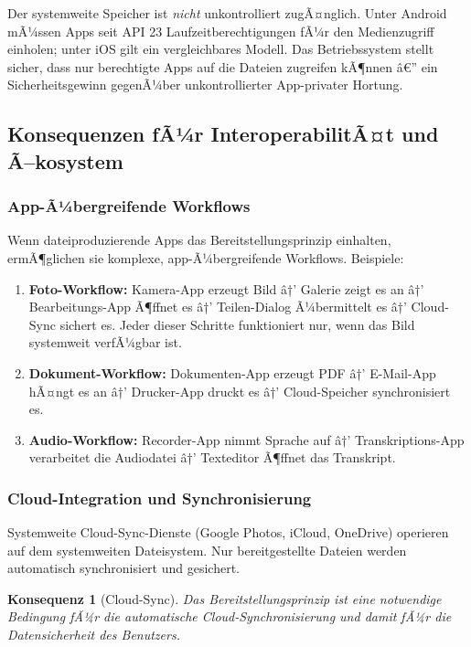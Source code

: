﻿\documentclass[12pt, a4paper]{article}
\newtheorem{konsequenz}[definition]{Konsequenz}
\begin{document}
Der systemweite Speicher ist \emph{nicht} unkontrolliert zugÃ¤nglich. Unter
Android mÃ¼ssen Apps seit API 23 Laufzeitberechtigungen fÃ¼r den Medienzugriff
einholen; unter iOS gilt ein vergleichbares Modell. Das Betriebssystem stellt
sicher, dass nur berechtigte Apps auf die Dateien zugreifen kÃ¶nnen â€” ein
Sicherheitsgewinn gegenÃ¼ber unkontrollierter App-privater Hortung.

\subsection{Konsequenzen fÃ¼r InteroperabilitÃ¤t und Ã–kosystem}

\subsubsection{App-Ã¼bergreifende Workflows}

Wenn dateiproduzierende Apps das Bereitstellungsprinzip einhalten, ermÃ¶glichen
sie komplexe, app-Ã¼bergreifende Workflows. Beispiele:

\begin{enumerate}[label=\textbf{\arabic*.}]
  \item \textbf{Foto-Workflow:} Kamera-App erzeugt Bild â†’ Galerie zeigt es an â†’
    Bearbeitungs-App Ã¶ffnet es â†’ Teilen-Dialog Ã¼bermittelt es â†’ Cloud-Sync
    sichert es. Jeder dieser Schritte funktioniert nur, wenn das Bild systemweit
    verfÃ¼gbar ist.
  \item \textbf{Dokument-Workflow:} Dokumenten-App erzeugt PDF â†’ E-Mail-App
    hÃ¤ngt es an â†’ Drucker-App druckt es â†’ Cloud-Speicher synchronisiert es.
  \item \textbf{Audio-Workflow:} Recorder-App nimmt Sprache auf â†’ Transkriptions-App
    verarbeitet die Audiodatei â†’ Texteditor Ã¶ffnet das Transkript.
\end{enumerate}

\subsubsection{Cloud-Integration und Synchronisierung}

Systemweite Cloud-Sync-Dienste (Google Photos, iCloud, OneDrive) operieren auf
dem systemweiten Dateisystem. Nur bereitgestellte Dateien werden automatisch
synchronisiert und gesichert.

\begin{konsequenz}[Cloud-Sync]
Das Bereitstellungsprinzip ist eine notwendige Bedingung fÃ¼r die automatische
Cloud-Synchronisierung und damit fÃ¼r die Datensicherheit des Benutzers.
\end{konsequenz}
\end{document}

